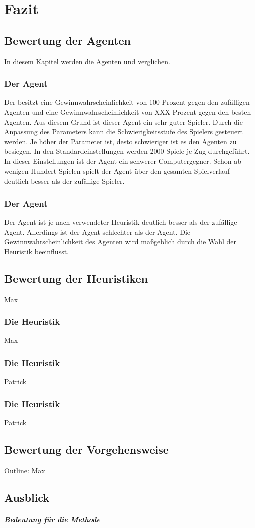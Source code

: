 \chapter{Fazit}

\section{Bewertung der Agenten}
In diesem Kapitel werden die Agenten  und  verglichen.
\subsection{Der Agent }
Der  besitzt eine Gewinnwahrscheinlichkeit von 100 Prozent gegen den zufälligen Agenten und eine Gewinnwahrscheinlichkeit von XXX  Prozent gegen den besten  Agenten. Aus diesem Grund ist dieser Agent ein sehr guter Spieler. Durch die Anpassung des Parameters  kann die Schwierigkeitsstufe des Spielers gesteuert werden. Je höher der Parameter ist, desto schwieriger ist es den Agenten zu besiegen. In den Standardeinstellungen werden 2000  Spiele je Zug durchgeführt. In dieser Einstellungen ist der Agent ein schwerer Computergegner. Schon ab wenigen Hundert Spielen spielt der Agent über den gesamten Spielverlauf deutlich besser als der zufällige Spieler. 
\subsection{Der Agent }
Der  Agent ist je nach verwendeter Heuristik deutlich besser als der zufällige Agent. Allerdings ist  der Agent schlechter als der  Agent. Die Gewinnwahrscheinlichkeit des Agenten wird maßgeblich durch die Wahl der Heuristik beeinflusst.

\section{Bewertung der Heuristiken}
Max
\subsection{Die Heuristik }
Max
\subsection{Die Heuristik }
Patrick
\subsection{Die Heuristik }
Patrick

\section{Bewertung der Vorgehensweise}
Outline: Max

\section{Ausblick}
\paragraph{Bedeutung für die Methode}

